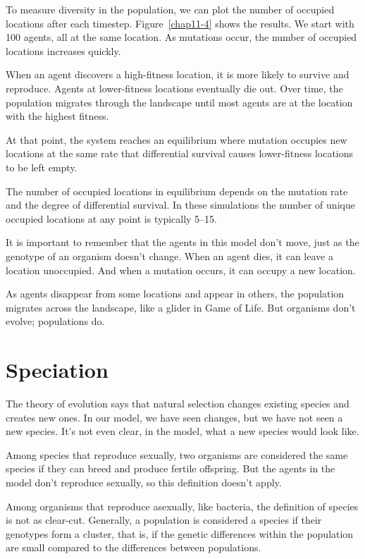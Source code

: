 \documentclass[12pt]{book}
\theoremstyle{exercise}
\begin{document}
To measure diversity in the population, we can plot the number of occupied locations after each timestep.  Figure~\ref{chap11-4} shows the results.  We start with 100 agents, all at the same location.  As mutations occur, the number of occupied locations increases quickly. 

When an agent discovers a high-fitness location, it is more likely to survive and reproduce.  Agents at lower-fitness locations eventually die out.  Over time, the population migrates through the landscape until most agents are at the location with the highest fitness.

At that point, the system reaches an equilibrium where mutation occupies new locations at the same rate that differential survival causes lower-fitness locations to be left empty.

The number of occupied locations in equilibrium depends on the mutation rate and the degree of differential survival.  In these simulations the number of unique occupied locations at any point is typically 5--15.

It is important to remember that the agents in this model don't move, just as the genotype of an organism doesn't change.  When an agent dies, it can leave a location unoccupied.  And when a mutation occurs, it can occupy a new location.

As agents disappear from some locations and appear in others, the population migrates across the landscape, like a glider in Game of Life.  But organisms don't evolve; populations do.


\section{Speciation}

The theory of evolution says that natural selection changes existing species and creates new ones.  In our model, we have seen changes, but we have not seen a new species.  It's not even clear, in the model, what a new species would look like.

Among species that reproduce sexually, two organisms are considered the same species if they can breed and produce fertile offspring.  But the agents in the model don't reproduce sexually, so this definition doesn't apply.

Among organisms that reproduce asexually, like bacteria, the definition of species is not as clear-cut.  Generally, a population is considered a species if their genotypes form a cluster, that is, if the genetic differences within the population are small compared to the differences between populations.
\end{document}
